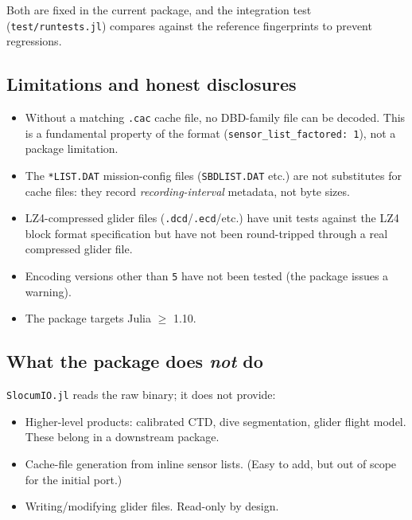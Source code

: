 \documentclass[11pt]{article}
\begin{document}
Both are fixed in the current package, and the integration test
(\texttt{test/runtests.jl}) compares against the reference fingerprints to
prevent regressions.

\subsection{Limitations and honest disclosures}

\begin{itemize}[leftmargin=*,topsep=1pt,itemsep=0pt]
  \item Without a matching \texttt{.cac} cache file, no DBD-family file can
        be decoded.  This is a fundamental property of the format
        (\texttt{sensor\_list\_factored: 1}), not a package limitation.
  \item The \texttt{*LIST.DAT} mission-config files (\texttt{SBDLIST.DAT}
        etc.) are not substitutes for cache files: they record
        \emph{recording-interval} metadata, not byte sizes.
  \item LZ4-compressed glider files (\texttt{.dcd}/\texttt{.ecd}/etc.) have
        unit tests against the LZ4 block format specification but have not
        been round-tripped through a real compressed glider file.
  \item Encoding versions other than \texttt{5} have not been tested
        (the package issues a warning).
  \item The package targets Julia $\geq$ 1.10.
\end{itemize}

\subsection{What the package does \emph{not} do}

\texttt{SlocumIO.jl} reads the raw binary; it does not provide:
\begin{itemize}[leftmargin=*,topsep=1pt,itemsep=0pt]
  \item Higher-level products: calibrated CTD, dive segmentation, glider
        flight model.  These belong in a downstream package.
  \item Cache-file generation from inline sensor lists.  (Easy to add, but
        out of scope for the initial port.)
  \item Writing/modifying glider files.  Read-only by design.
\end{itemize}
\end{document}
